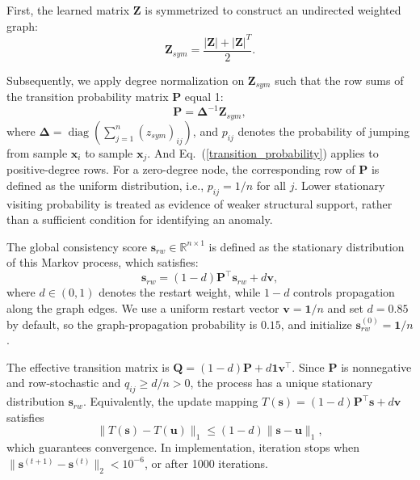 \documentclass[ASNA,twocolumn]{USG} %
\begin{document}
First, the learned matrix $\boldsymbol{Z}$ is symmetrized to construct an undirected weighted graph:
\begin{equation}
    \boldsymbol{Z}_{sym} = \frac{\boldsymbol{\left|Z\right|} + \boldsymbol{\left|Z\right|}^T}{2}.
\end{equation}

Subsequently, we apply degree normalization on $\boldsymbol{Z}_{sym}$ such that the row sums of the transition probability matrix $\boldsymbol{P}$ equal 1:
\begin{equation}\label{transition_probability}
    \boldsymbol{P} = \boldsymbol{\Delta}^{-1} \boldsymbol{Z}_{sym},
\end{equation}
where $\boldsymbol{\Delta}=\operatorname{diag}\left(\sum_{j=1}^n\left(z_{s y m}\right)_{i j}\right)$, and $p_{ij}$ denotes the probability of jumping from sample $\boldsymbol{x}_i$ to sample $\boldsymbol{x}_j$. And Eq.~(\ref{transition_probability}) applies to positive-degree rows. For a zero-degree node, the corresponding row of $\boldsymbol P$ is defined as the uniform distribution, i.e., $p_{ij}=1/n$ for all $j$. Lower stationary visiting probability is treated as evidence of weaker structural support, rather than a sufficient condition for identifying an anomaly.

The global consistency score $\boldsymbol{s}_{rw} \in \mathbb{R}^{n \times 1}$ is defined as the stationary distribution of this Markov process, which satisfies:
\begin{equation}\label{randomwalk_outlier_score}
    \boldsymbol{s}_{rw}
    = (1-d)\boldsymbol{P}^{\top}\boldsymbol{s}_{rw}
    + d\boldsymbol{v},
\end{equation}
where $d\in(0,1)$ denotes the restart weight, while $1-d$ controls propagation along the graph edges. We use a uniform restart vector $\boldsymbol {v}=\boldsymbol{1}/n$ and set $d=0.85$ by default, so the graph-propagation probability is $0.15$, and initialize $\boldsymbol s_{rw}^{(0)}=\boldsymbol{1}/n$.

The effective transition matrix is $\boldsymbol{Q}=(1-d)\boldsymbol{P}+d\boldsymbol{1}\boldsymbol{v}^\top$. Since $\boldsymbol{P}$ is nonnegative and row-stochastic and $q_{ij}\geq d/n>0$, the process has a unique stationary distribution $\boldsymbol{s}_{rw}$. Equivalently, the update mapping $T(\boldsymbol{s})=(1-d)\boldsymbol{P}^\top \boldsymbol{s}+d\boldsymbol{v}$ satisfies
\begin{equation}
    \|T(\boldsymbol{s})-T(\boldsymbol{u})\|_1\leq(1-d)\|\boldsymbol{s}-\boldsymbol{u}\|_1,
\end{equation}
which guarantees convergence. In implementation, iteration stops when $\|\boldsymbol{s}^{(t+1)}-\boldsymbol{s}^{(t)}\|_2<10^{-6}$, or after 1000 iterations.
\end{document}
